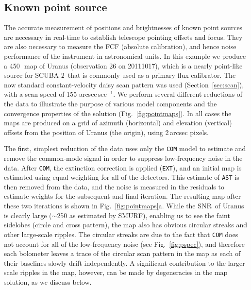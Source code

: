 \documentclass[useAMS,usenatbib,nofootinbib]{mn2e}
\newcommand{\snr}{SNR}
\newcommand{\scuba}{SCUBA-2}
\newcommand{\model}[1]{\texttt{#1}}
\begin{document}
\subsection{Known point source}
\label{sec:point}

The accurate measurement of positions and brightnesses of known point
sources are necessary in real-time to establish telescope pointing
offsets and focus. They are also necessary to measure the FCF
(absolute calibration), and hence noise performance of the instrument
in astronomical units.  In this example we produce a 450\,\micron\ map
of Uranus (observation 26 on 20111017), which is a nearly point-like
source for \scuba\ that is commonly used as a primary flux
calibrator. The now standard constant-velocity daisy scan pattern was
used (Section~\ref{sec:scan}), with a scan speed of 155
arcsec\,sec$^{-1}$. We perform several different reductions of the
data to illustrate the purpose of various model components and the
convergence properties of the solution (Fig.~\ref{fig:pointmaps}). In
all cases the maps are produced on a grid of azimuth (horizontal) and
elevation (vertical) offsets from the position of Uranus (the origin),
using 2\,arcsec pixels.

The first, simplest reduction of the data uses only the \model{COM}
model to estimate and remove the common-mode signal in order to
suppress low-frequency noise in the data. After \model{COM}, the
extinction correction is applied (\model{EXT}), and an initial map is
estimated using equal weighting for all of the detectors. This
estimate of \model{AST} is then removed from the data, and the noise
is measured in the residuals to estimate weights for the subsequent
and final iteration. The resulting map after these two iterations is
shown in Fig.~\ref{fig:pointmaps}a. While the \snr\ of Uranus is clearly
large ($\sim$250 as estimated by SMURF), enabling us to see the faint
sidelobes (circle and cross pattern), the map also has obvious
circular streaks and other large-scale ripples. The circular streaks
are due to the fact that \model{COM} does not account for all of the
low-frequency noise (see Fig.~\ref{fig:pspec}), and therefore each
bolometer leaves a trace of the circular scan pattern in the map as
each of their baselines slowly drift independently. A significant
contribution to the larger-scale ripples in the map, however, can be
made by degeneracies in the map solution, as we discuss below.
\end{document}
